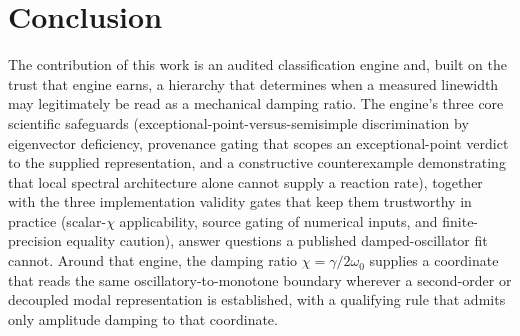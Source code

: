 \section{Conclusion}

The contribution of this work is an audited classification engine and, built on the trust that engine earns, a hierarchy that determines when a measured linewidth may legitimately be read as a mechanical damping ratio. The engine's three core scientific safeguards (exceptional-point-versus-semisimple discrimination by eigenvector deficiency, provenance gating that scopes an exceptional-point verdict to the supplied representation, and a constructive counterexample demonstrating that local spectral architecture alone cannot supply a reaction rate), together with the three implementation validity gates that keep them trustworthy in practice (scalar-\(\chi\) applicability, source gating of numerical inputs, and finite-precision equality caution), answer questions a published damped-oscillator fit cannot. Around that engine, the damping ratio \(\chi = \gamma/2\omega_0\) supplies a coordinate that reads the same oscillatory-to-monotone boundary wherever a second-order or decoupled modal representation is established, with a qualifying rule that admits only amplitude damping to that coordinate.

